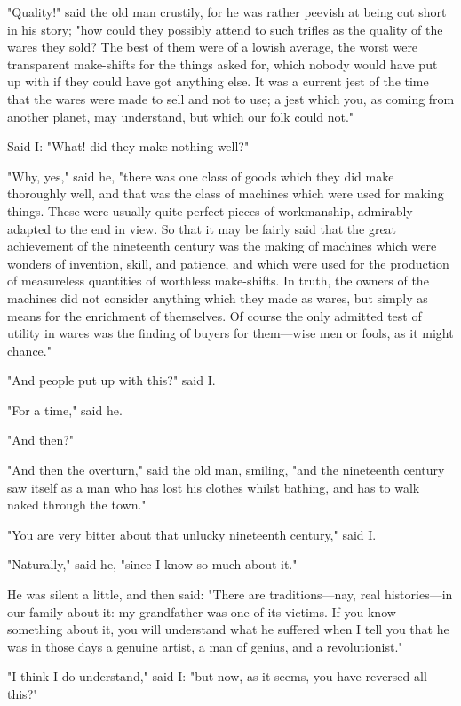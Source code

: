 "Quality!" said the old man crustily, for he was rather peevish at being
cut short in his story; "how could they possibly attend to such trifles
as the quality of the wares they sold? The best of them were of a lowish
average, the worst were transparent make-shifts for the things asked
for, which nobody would have put up with if they could have got anything
else. It was a current jest of the time that the wares were made to sell
and not to use; a jest which you, as coming from another planet, may
understand, but which our folk could not."

Said I: "What! did they make nothing well?"

"Why, yes," said he, "there was one class of goods which they did make
thoroughly well, and that was the class of machines which were used for
making things. These were usually quite perfect pieces of workmanship,
admirably adapted to the end in view. So that it may be fairly said that
the great achievement of the nineteenth century was the making of
machines which were wonders of invention, skill, and patience, and which
were used for the production of measureless quantities of worthless
make-shifts. In truth, the owners of the machines did not consider
anything which they made as wares, but simply as means for the
enrichment of themselves. Of course the only admitted test of utility in
wares was the finding of buyers for them---wise men or fools, as it
might chance."

"And people put up with this?" said I.

"For a time," said he.

"And then?"

"And then the overturn," said the old man, smiling, "and the nineteenth
century saw itself as a man who has lost his clothes whilst bathing, and
has to walk naked through the town."

"You are very bitter about that unlucky nineteenth century," said I.

"Naturally," said he, "since I know so much about it."

He was silent a little, and then said: "There are traditions---nay, real
histories---in our family about it: my grandfather was one of its
victims. If you know something about it, you will understand what he
suffered when I tell you that he was in those days a genuine artist, a
man of genius, and a revolutionist."

"I think I do understand," said I: "but now, as it seems, you have
reversed all this?"

